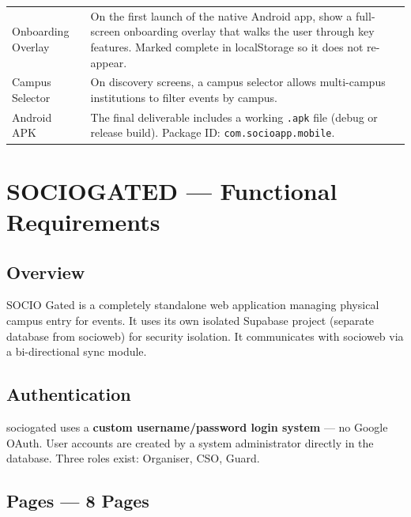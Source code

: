 \documentclass[12pt,a4paper]{article}
\begin{document}
\begin{tabularx}{\textwidth}{L{4.5cm} X}
Onboarding Overlay & On the first launch of the native Android app, show a full-screen onboarding overlay that walks the user through key features. Marked complete in localStorage so it does not re-appear. \\
Campus Selector & On discovery screens, a campus selector allows multi-campus institutions to filter events by campus. \\
Android APK & The final deliverable includes a working \texttt{.apk} file (debug or release build). Package ID: \texttt{com.socioapp.mobile}. \\
\bottomrule
\end{tabularx}

\newpage
\section{SOCIOGATED — Functional Requirements}

\subsection{Overview}

SOCIO Gated is a completely standalone web application managing physical campus entry for events. It uses its own isolated Supabase project (separate database from socioweb) for security isolation. It communicates with socioweb via a bi-directional sync module.

\subsection{Authentication}

sociogated uses a \textbf{custom username/password login system} — no Google OAuth. User accounts are created by a system administrator directly in the database. Three roles exist: Organiser, CSO, Guard.

\subsection{Pages — 8 Pages}
\end{document}
